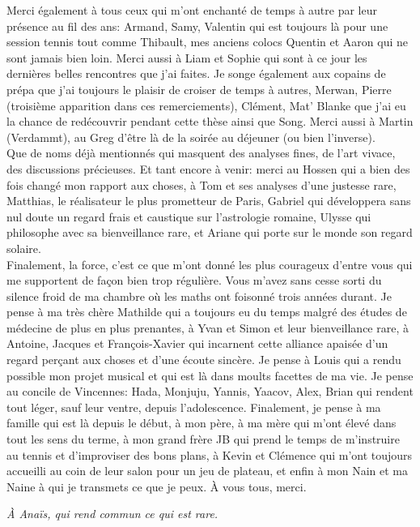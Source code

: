 Merci également à tous ceux qui m'ont enchanté de temps à autre par leur présence au fil des ans: Armand, Samy, Valentin qui est toujours là pour une session tennis tout comme Thibault, mes anciens colocs Quentin et Aaron qui ne sont jamais bien loin. Merci aussi à Liam et Sophie qui sont à ce jour les dernières belles rencontres que j'ai faites.
Je songe également aux copains de prépa que j'ai toujours le plaisir de croiser de temps à autres, Merwan, Pierre (troisième apparition dans ces remerciements), Clément, Mat' Blanke que j'ai eu la chance de redécouvrir pendant cette thèse ainsi que Song. Merci aussi à Martin (Verdammt), au Greg d'être là de la soirée au déjeuner (ou bien l'inverse).\\  
Que de noms déjà mentionnés qui masquent des analyses fines, de l'art vivace, des discussions précieuses. Et tant encore à venir: merci au Hossen qui a bien des fois changé mon rapport aux choses, à Tom et ses analyses d'une justesse rare, Matthias, le réalisateur le plus prometteur de Paris, Gabriel qui développera sans nul doute un regard frais et caustique sur l'astrologie romaine, Ulysse qui philosophe avec sa bienveillance rare, et Ariane qui porte sur le monde son regard solaire.\\
Finalement, la force, c'est ce que m'ont donné les plus courageux d'entre vous qui me supportent de façon bien trop régulière. Vous m'avez sans cesse sorti du silence froid de ma chambre où les maths ont foisonné trois années durant. Je pense à ma très chère Mathilde qui a toujours eu du temps malgré des études de médecine de plus en plus prenantes, à Yvan et Simon et leur bienveillance rare, à Antoine, Jacques et François-Xavier qui incarnent cette alliance apaisée d'un regard perçant aux choses et d'une écoute sincère. Je pense à Louis qui a rendu possible mon projet musical et qui est là dans moults facettes de ma vie. Je pense au concile de Vincennes: Hada, Monjuju, Yannis, Yaacov, Alex, Brian qui rendent tout léger, sauf leur ventre, depuis l'adolescence. Finalement, je pense à ma famille qui est là depuis le début, à mon père, à ma mère qui m'ont élevé dans tout les sens du terme, à mon grand frère JB qui prend le temps de m'instruire au tennis et d'improviser des bons plans, à Kevin et Clémence qui m'ont toujours accueilli au coin de leur salon pour un jeu de plateau, et enfin à mon Nain et ma Naine à qui je transmets ce que je peux. À vous tous, merci.

\newpage
\textit{À Anaïs, qui rend commun ce qui est rare.}
